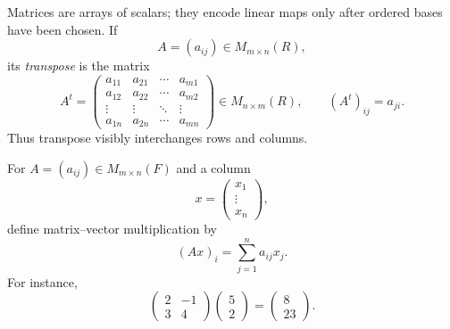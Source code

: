 Matrices are arrays of scalars; they encode linear maps only after ordered
bases have been chosen. If
\[
A=(a_{ij})\in M_{m\times n}(R),
\]
its \emph{transpose} is the matrix
\[
A^t=
\begin{pmatrix}
a_{11}&a_{21}&\cdots&a_{m1}\\
a_{12}&a_{22}&\cdots&a_{m2}\\
\vdots&\vdots&\ddots&\vdots\\
a_{1n}&a_{2n}&\cdots&a_{mn}
\end{pmatrix}
\in M_{n\times m}(R),
\qquad
(A^t)_{ij}=a_{ji}.
\]
Thus transpose visibly interchanges rows and columns.

For \(A=(a_{ij})\in M_{m\times n}(F)\) and a column
\[
x=\begin{pmatrix}x_1\\\vdots\\x_n\end{pmatrix},
\]
define matrix--vector multiplication by
\[
(Ax)_i=\sum_{j=1}^n a_{ij}x_j.
\]
For instance,
\[
\begin{pmatrix}2&-1\\3&4\end{pmatrix}
\begin{pmatrix}5\\2\end{pmatrix}
=\begin{pmatrix}8\\23\end{pmatrix}.
\]

